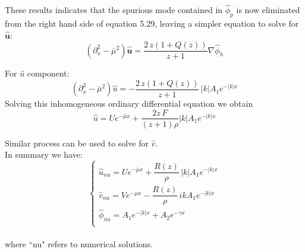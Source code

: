 These results indicates that the spurious mode contained in $\hat{\phi}_p$ is now eliminated from the right hand side of equation 5.29, leaving a simpler equation to solve for $\hat{\textbf{u}}$:
\begin{equation}
(\partial_x^2 - \bar{\mu}^2) \hat{\textbf{u}} = \dfrac{2\, z (1+ Q(z))}{z + 1} \nabla \hat{\phi}_h
\end{equation}

For $\hat{u}$ component:
\begin{equation*}
(\partial_x^2 - \bar{\mu}^2) \hat{u} = - \dfrac{2 \, z (1+ Q(z))}{z + 1} \, |k| A_1 e^{- |k| x}
\end{equation*}
Solving this inhomogeneous ordinary differential equation we obtain
\begin{dmath*}
\hat{u} = U e^{-\bar{\mu} x} + \dfrac{2z\,F}{(z+1)\rho} |k| A_1 e^{- |k| x}
\end{dmath*}

Similar process can be used to solve for $\hat{v}$.\\

In summary we have:
\begin{equation}
\begin{cases}
\hat{u}_{nu} = U e^{-\bar{\mu} x} + \dfrac{R(z)}{\rho} \, |k| A_1 e^{- |k| x} \\
\hat{v}_{nu} = V e^{-\bar{\mu} x} - \dfrac{R(z)}{\rho} \, i k A_1 e^{- |k| x} \\
\hat{\phi}_{nu} = A_1 e^{- |k| x} + A_2 e^{- \gamma x} \\
\end{cases}
\end{equation}\\
where ``nu" refers to numerical solutions.\\

